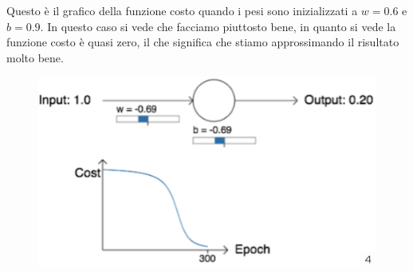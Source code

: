 Questo è il grafico della funzione costo quando i pesi sono inizializzati a $w=0.6$ e $b=0.9$. In questo caso si vede che facciamo piuttosto bene, in quanto si vede la funzione costo è quasi zero, il che significa che stiamo approssimando il risultato molto bene.



\begin{figure}[h]
    \includegraphics[scale=.4]{images/best_practices/second_graph.png}
    \centering
\end{figure}



